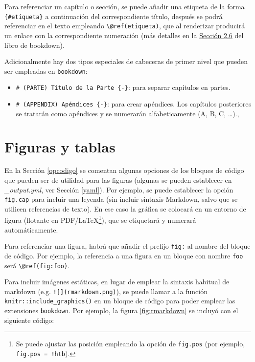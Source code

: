 \documentclass[]{book}
\let\rmarkdownfootnote\footnote%
\def\footnote{\protect\rmarkdownfootnote}
\theoremstyle{definition}
\theoremstyle{definition}
\theoremstyle{definition}
\theoremstyle{remark}
\begin{document}
Para referenciar un capítulo o sección, se puede añadir una etiqueta de
la forma \texttt{\{\#etiqueta\}} a continuación del correspondiente
título, después se podrá referenciar en el texto empleando
\texttt{\textbackslash{}@ref(etiqueta)}, que al renderizar producirá un
enlace con la correspondiente numeración (más detalles en la
\href{https://bookdown.org/yihui/bookdown/cross-references.html}{Sección
2.6} del libro de bookdown).

Adicionalmente hay dos tipos especiales de cabeceras de primer nivel que
pueden ser empleadas en \texttt{bookdown}:

\begin{itemize}
\item
  \texttt{\#\ (PARTE)\ Titulo\ de\ la\ Parte\ \{-\}}: para separar
  capítulos en partes.
\item
  \texttt{\#\ (APPENDIX)\ Apéndices\ \{-\}}: para crear apéndices. Los
  capítulos posteriores se tratarán como apéndices y se numerarán
  alfabeticamente (A, B, C, \ldots{}).,
\end{itemize}

\section{Figuras y tablas}\label{figuras-y-tablas}

En la Sección \ref{opcodigo} se comentan algunas opciones de los bloques
de código que pueden ser de utilidad para las figuras (algunas se pueden
establecer en \emph{\_output.yml}, ver Sección \ref{yaml}). Por ejemplo,
se puede establecer la opción \texttt{fig.cap} para incluir una leyenda
(sin incluir sintaxis Markdown, salvo que se utilicen referencias de
texto). En ese caso la gráfica se colocará en un entorno de figura
(flotante en PDF/LaTeX\footnote{Se puede ajustar las posición empleando
  la opción de \texttt{fig.pos} (por ejemplo,
  \texttt{fig.pos\ =\ \textquotesingle{}!htb\textquotesingle{}}).}), que
se etiquetará y numerará automáticamente.

Para referenciar una figura, habrá que añadir el prefijo \texttt{fig:}
al nombre del bloque de código. Por ejemplo, la referencia a una figura
en un bloque con nombre \texttt{foo} será
\texttt{\textbackslash{}@ref(fig:foo)}.

Para incluir imágenes estáticas, en lugar de emplear la sintaxis
habitual de markdown (e.g. \texttt{!{[}{]}(rmarkdown.png)}), se puede
llamar a la función \texttt{knitr::include\_graphics()} en un bloque de
código para poder emplear las extensiones \texttt{bookdown}. Por
ejemplo, la figura \ref{fig:rmarkdown} se incluyó con el siguiente
código:
\end{document}

